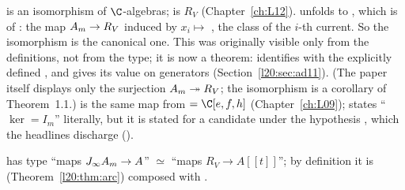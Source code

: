 \begin{dictionary}
 is an isomorphism of $\C$-algebras;  is $R_V$ (Chapter~\ref{ch:L12}).
 unfolds to , which is  of
: the map $A_m\to R_V$ induced by $x_i\mapsto$ , the class of the $i$-th
current. So the isomorphism is the canonical one. This was originally visible only from the definitions, not from the
type; it is now a theorem:  identifies  with the explicitly defined
, and  gives its value on generators (Section~\ref{l20:sec:ad11}). (The paper itself displays only the
surjection $A_m\twoheadrightarrow R_V$; the isomorphism is a corollary of Theorem~1.1.)  is the same map from  $=\C[e,f,h]$ (Chapter~\ref{ch:L09});
 states ``$\ker=I_m$'' literally, but it is stated for a candidate under the
hypothesis , which the headlines discharge ().

 has type ``maps $J_\infty A_m\to A$'' $\simeq$ ``maps $R_V\to A[[t]]$''; by definition it is
 (Theorem~\ref{l20:thm:arc}) composed with .
\end{dictionary}

